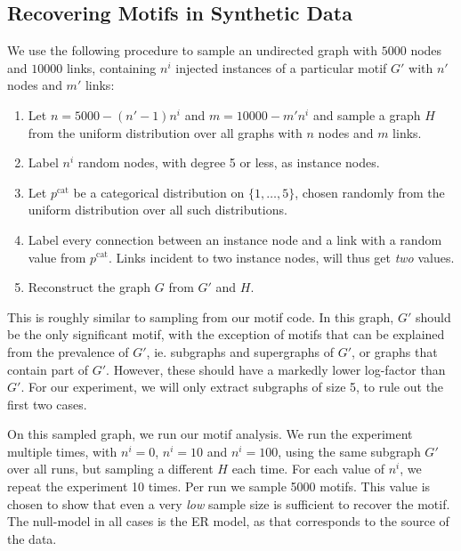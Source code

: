 \subsection*{Recovering Motifs in Synthetic Data}

\label{section:recovering}

We use the following procedure to sample an undirected graph with $5000$ nodes and $10000$ links, containing $n^i$ injected instances of a particular motif $G'$ with $n'$ nodes and $m'$ links:

\begin{enumerate}
  \item Let $n = 5000 - (n'-1)n^i$ and $m = 10000 - m'n^i$ and sample a graph $H$ from the uniform distribution over all graphs with $n$ nodes and $m$ links.   
  \item Label $n^i$ random nodes, with degree 5 or less, as instance nodes.
  \item Let $p^\text{cat}$ be a categorical distribution on $\{1, \ldots, 5\}$, chosen randomly from the uniform distribution over all such distributions.
  \item Label every connection between an instance node and a link with a random value from $p^\text{cat}$. Links incident to two instance nodes, will thus get \emph{two} values.
  \item Reconstruct the graph $G$ from $G'$ and $H$.
\end{enumerate}

This is roughly similar to sampling from our motif code. In this graph, $G'$ should be the only significant motif, with the exception of motifs that can be explained from the prevalence of $G'$, ie. subgraphs and supergraphs of $G'$, or graphs that contain part of $G'$. However, these should have a markedly lower log-factor than $G'$. For our experiment, we will only extract subgraphs of size 5, to rule out the first two cases.

On this sampled graph, we run our motif analysis. We run the experiment multiple times, with $n^i = 0$, $n^i = 10$ and $n^i = 100$, using the same subgraph $G'$ over all runs, but sampling a different $H$ each time. For each value of $n^i$, we repeat the experiment 10 times. Per run we sample 5000 motifs. This value is chosen to show that even a very \emph{low} sample size is sufficient to recover the motif. The null-model in all cases is the ER model, as that corresponds to the source of the data.


